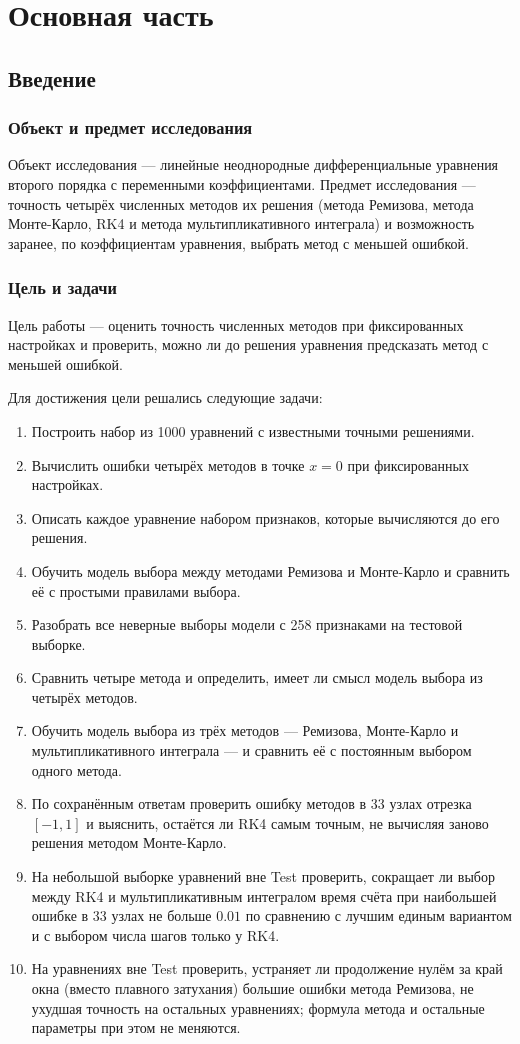 \documentclass[14pt,a4paper]{extarticle}
\begin{document}
\section{Основная часть}
\subsection{Введение}
\subsubsection{Объект и предмет исследования}
Объект исследования --- линейные неоднородные дифференциальные
уравнения второго порядка с переменными коэффициентами. Предмет
исследования --- точность четырёх численных методов их решения (метода
Ремизова, метода Монте-Карло, RK4 и метода мультипликативного интеграла)
и возможность заранее, по коэффициентам уравнения, выбрать метод
с меньшей ошибкой.

\subsubsection{Цель и задачи}
Цель работы --- оценить точность численных методов при фиксированных
настройках и проверить, можно ли до решения уравнения предсказать метод
с меньшей ошибкой.

Для достижения цели решались следующие задачи:
\begin{enumerate}
\item Построить набор из 1000 уравнений с известными точными решениями.
\item Вычислить ошибки четырёх методов в точке $x=0$ при фиксированных
настройках.
\item Описать каждое уравнение набором признаков, которые вычисляются
до его решения.
\item Обучить модель выбора между методами Ремизова и Монте-Карло
и сравнить её с простыми правилами выбора.
\item Разобрать все неверные выборы модели с 258 признаками
на тестовой выборке.
\item Сравнить четыре метода и определить, имеет ли смысл модель выбора
из четырёх методов.
\item Обучить модель выбора из трёх методов --- Ремизова, Монте-Карло
и мультипликативного интеграла --- и сравнить её с постоянным выбором
одного метода.
\item По сохранённым ответам проверить ошибку методов в 33 узлах
отрезка $[-1,1]$ и выяснить, остаётся ли RK4 самым точным, не вычисляя
заново решения методом Монте-Карло.
\item На небольшой выборке уравнений вне Test проверить, сокращает ли
выбор между RK4 и мультипликативным интегралом время счёта при
наибольшей ошибке в 33 узлах не больше $0.01$ по сравнению с лучшим
единым вариантом и с выбором числа шагов только у RK4.
\item На уравнениях вне Test проверить, устраняет ли продолжение нулём
за край окна (вместо плавного затухания) большие ошибки метода
Ремизова, не ухудшая точность на остальных уравнениях; формула метода
и остальные параметры при этом не меняются.
\end{enumerate}
\end{document}
